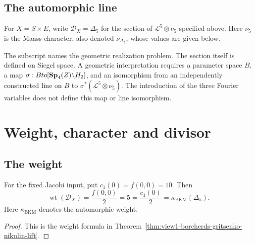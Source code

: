 \subsection{The automorphic line}
\label{ssec:view1-package}

\begin{definition}
\label{def:view1-borcherds-gritsenko-nikulin-section}
For \(X=S\times E\), write
\(\mathcal D_X=\Delta_5\) for the section of
\(\mathcal L^5\otimes\nu_5\) specified above.
Here \(\nu_5\) is the Maass character, also denoted
\(\nu_{\Delta_5}\), whose values are given below.
\end{definition}

\begin{remark}
\label{rem:view1-D-X-naming}
The subscript names the geometric realization problem.
The section itself is defined on Siegel space.
A geometric interpretation requires a parameter space \(B\), a map
\(\sigma:Bto[\mathbf{Sp}_4(Z)\backslash H_2]\), and an isomorphism
from an independently constructed line on \(B\) to
\(\sigma^*(\mathcal L^5\otimes\nu_5)\).
The introduction of the three Fourier variables does not define
this map or line isomorphism.
\end{remark}

\section{Weight, character and divisor}
\label{sec:view1-weight-multiplier-divisor}

\subsection{The weight}
\label{ssec:view1-borcherds-weight}

\begin{proposition}
\label{prop:view1-borcherds-gritsenko-weight-identity}
For the fixed Jacobi input, put \(c_1(0)=f(0,0)=10\).
Then
\[
 \operatorname{wt}(\mathcal D_X)
 =\frac{f(0,0)}2=5
 =\frac{c_1(0)}2=\kappa_{\mathrm{BKM}}(\Delta_5).
\]
Here \(\kappa_{\mathrm{BKM}}\) denotes the automorphic weight.
\end{proposition}

\begin{proof}
This is the weight formula in
Theorem~\ref{thm:view1-borcherds-gritsenko-nikulin-lift}.
\end{proof}


